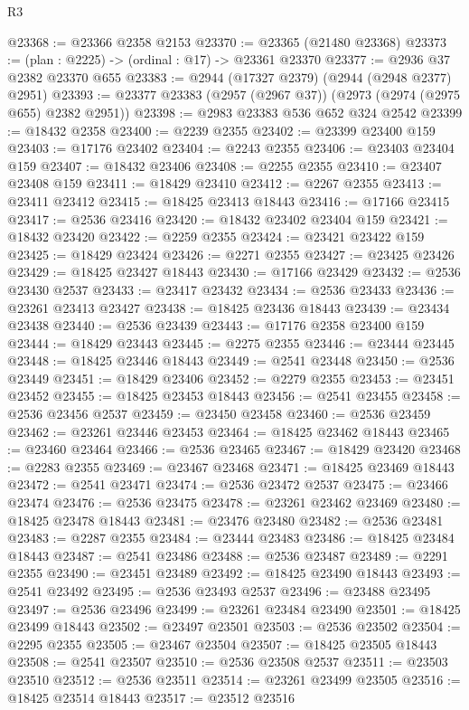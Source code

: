 \begin{lexlean}{R3}
\begin{coremodule}
@23368 := @23366 @2358 @2153
@23370 := @23365 (@21480 @23368)
@23373 := (plan : @2225) -> (ordinal : @17) -> @23361 @23370
@23377 := @2936 @37 @2382 @23370 @655
@23383 := @2944 (@17327 @2379) (@2944 (@2948 @2377) @2951)
@23393 := @23377 @23383 (@2957 (@2967 @37)) (@2973 (@2974 (@2975 @655) @2382 @2951))
@23398 := @2983 @23383 @536 @652 @324 @2542
@23399 := @18432 @2358
@23400 := @2239 @2355
@23402 := @23399 @23400 @159
@23403 := @17176 @23402
@23404 := @2243 @2355
@23406 := @23403 @23404 @159
@23407 := @18432 @23406
@23408 := @2255 @2355
@23410 := @23407 @23408 @159
@23411 := @18429 @23410
@23412 := @2267 @2355
@23413 := @23411 @23412
@23415 := @18425 @23413 @18443
@23416 := @17166 @23415
@23417 := @2536 @23416
@23420 := @18432 @23402 @23404 @159
@23421 := @18432 @23420
@23422 := @2259 @2355
@23424 := @23421 @23422 @159
@23425 := @18429 @23424
@23426 := @2271 @2355
@23427 := @23425 @23426
@23429 := @18425 @23427 @18443
@23430 := @17166 @23429
@23432 := @2536 @23430 @2537
@23433 := @23417 @23432
@23434 := @2536 @23433
@23436 := @23261 @23413 @23427
@23438 := @18425 @23436 @18443
@23439 := @23434 @23438
@23440 := @2536 @23439
@23443 := @17176 @2358 @23400 @159
@23444 := @18429 @23443
@23445 := @2275 @2355
@23446 := @23444 @23445
@23448 := @18425 @23446 @18443
@23449 := @2541 @23448
@23450 := @2536 @23449
@23451 := @18429 @23406
@23452 := @2279 @2355
@23453 := @23451 @23452
@23455 := @18425 @23453 @18443
@23456 := @2541 @23455
@23458 := @2536 @23456 @2537
@23459 := @23450 @23458
@23460 := @2536 @23459
@23462 := @23261 @23446 @23453
@23464 := @18425 @23462 @18443
@23465 := @23460 @23464
@23466 := @2536 @23465
@23467 := @18429 @23420
@23468 := @2283 @2355
@23469 := @23467 @23468
@23471 := @18425 @23469 @18443
@23472 := @2541 @23471
@23474 := @2536 @23472 @2537
@23475 := @23466 @23474
@23476 := @2536 @23475
@23478 := @23261 @23462 @23469
@23480 := @18425 @23478 @18443
@23481 := @23476 @23480
@23482 := @2536 @23481
@23483 := @2287 @2355
@23484 := @23444 @23483
@23486 := @18425 @23484 @18443
@23487 := @2541 @23486
@23488 := @2536 @23487
@23489 := @2291 @2355
@23490 := @23451 @23489
@23492 := @18425 @23490 @18443
@23493 := @2541 @23492
@23495 := @2536 @23493 @2537
@23496 := @23488 @23495
@23497 := @2536 @23496
@23499 := @23261 @23484 @23490
@23501 := @18425 @23499 @18443
@23502 := @23497 @23501
@23503 := @2536 @23502
@23504 := @2295 @2355
@23505 := @23467 @23504
@23507 := @18425 @23505 @18443
@23508 := @2541 @23507
@23510 := @2536 @23508 @2537
@23511 := @23503 @23510
@23512 := @2536 @23511
@23514 := @23261 @23499 @23505
@23516 := @18425 @23514 @18443
@23517 := @23512 @23516

\end{coremodule}
\end{lexlean}
